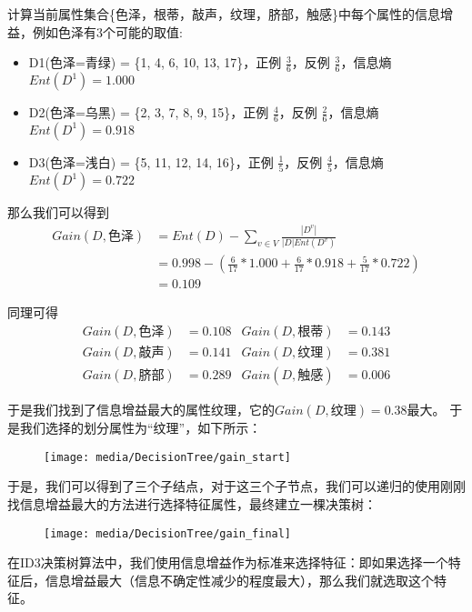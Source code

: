 \documentclass{ML}
\begin{document}
计算当前属性集合\{色泽，根蒂，敲声，纹理，脐部，触感\}中每个属性的信息增益，例如色泽有3个可能的取值:
\begin{itemize}
	\item D1(色泽=青绿) = \{1, 4, 6, 10, 13, 17\}，正例 $\frac{3}{6}$，反例 $\frac{3}{6}$，信息熵$Ent(D^1)=1.000$

	\item D2(色泽=乌黑) = \{2, 3, 7, 8, 9, 15\}，正例 $\frac{4}{6}$，反例 $\frac{2}{6}$，信息熵$Ent(D^1)=0.918$

	\item D3(色泽=浅白) = \{5, 11, 12, 14, 16\}，正例 $\frac{1}{5}$，反例 $\frac{4}{5}$，信息熵$Ent(D^1)=0.722$
\end{itemize}

那么我们可以得到
\begin{align*}
	Gain(D,\text{色泽}) & = Ent(D) - \sum_{v \in V} \frac{ |D^v| }{ |D| Ent(D^v) }                \\
	                    & = 0.998 - (\frac{6}{17}*1.000 + \frac{6}{17}*0.918 +\frac{5}{17}*0.722) \\
	                    & = 0.109
\end{align*}

同理可得
\begin{align*}
	Gain(D, \text{色泽}) & = 0.108 &
	Gain(D, \text{根蒂}) & = 0.143   \\
	Gain(D, \text{敲声}) & = 0.141 &
	Gain(D, \text{纹理}) & = 0.381   \\
	Gain(D, \text{脐部}) & = 0.289 &
	Gain(D, \text{触感}) & = 0.006
\end{align*}

于是我们找到了信息增益最大的属性纹理，它的$Gain(D, \text{纹理}) = 0.38$最大。
于是我们选择的划分属性为“纹理”，如下所示：

\begin{figure}[htbp]
	\centering
	\texttt{[image: media/DecisionTree/gain\_start]}
\end{figure}

于是，我们可以得到了三个子结点，对于这三个子节点，我们可以递归的使用刚刚找信息增益最大的方法进行选择特征属性，最终建立一棵决策树：

\begin{figure}[H]
	\centering
	\texttt{[image: media/DecisionTree/gain\_final]}
\end{figure}

在ID3决策树算法中，我们使用信息增益作为标准来选择特征：即如果选择一个特征后，信息增益最大（信息不确定性减少的程度最大），那么我们就选取这个特征。
\end{document}
